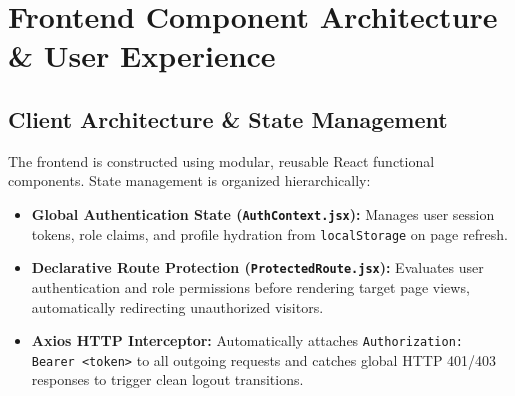 \documentclass[11pt,a4paper]{article}
\begin{document}
\section{Frontend Component Architecture \& User Experience}

\subsection{Client Architecture \& State Management}
The frontend is constructed using modular, reusable React functional components. State management is organized hierarchically:
\begin{itemize}[leftmargin=1.4em, itemsep=0.2em]
  \item \textbf{Global Authentication State (\texttt{AuthContext.jsx}):} Manages user session tokens, role claims, and profile hydration from \texttt{localStorage} on page refresh.
  \item \textbf{Declarative Route Protection (\texttt{ProtectedRoute.jsx}):} Evaluates user authentication and role permissions before rendering target page views, automatically redirecting unauthorized visitors.
  \item \textbf{Axios HTTP Interceptor:} Automatically attaches \texttt{Authorization: Bearer <token>} to all outgoing requests and catches global HTTP 401/403 responses to trigger clean logout transitions.
\end{itemize}
\end{document}
